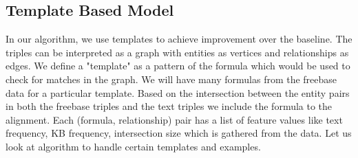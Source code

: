 \documentclass[12pt, a4paper]{article}
\begin{document}
\subsection{Template Based Model}
In our algorithm, we use templates to achieve improvement over the baseline. The triples can be interpreted as a graph with entities as vertices and relationships as edges. We define a "template" as a pattern of the formula which would be used to check for matches in the graph. We will have many formulas from the freebase data for a particular template. Based on the intersection between the entity pairs in both the freebase triples and the text triples we include the formula to the alignment. Each (formula, relationship) pair has a list of feature values like text frequency, KB frequency, intersection size which is gathered from the data. Let us look at algorithm to handle certain templates and examples.\\
\end{document}
